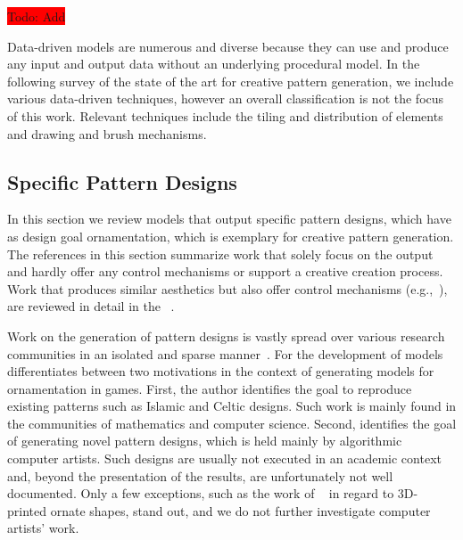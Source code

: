 \colorbox{red} {Todo: Add \cite{pauly_2009_sot, barnes_2017_aso}}



Data-driven models are numerous and diverse because they can use and produce any input and output data without an underlying procedural model. In the following survey of the state of the art for creative pattern generation, we include various data-driven techniques, however an overall classification is not the focus of this work. Relevant techniques include the tiling and distribution of elements and drawing and brush mechanisms.



\subsection{Specific Pattern Designs}
\label{subsec:specific_pattern_designs}

In this section we review models that output specific pattern designs, which have as design goal ornamentation, which is exemplary for creative pattern generation. The references in this section summarize work that solely focus on the output and hardly offer any control mechanisms or support a creative creation process. Work that produces similar aesthetics but also offer control mechanisms (e.g.,~\cite{wong_1998_cgf,yu_2012_ans,zehnder_2016_dso}), are reviewed in detail in the ~.


Work on the generation of pattern designs is vastly spread over various research communities in an isolated and sparse manner~\cite{whitehead_2010_tpd}. For the development of models \citeauthor*{whitehead_2010_tpd}~\cite{whitehead_2010_tpd} differentiates between two motivations in the context of generating models for ornamentation in games. First, the author identifies the goal to reproduce existing patterns such as Islamic and Celtic designs. Such work is mainly found in the communities of mathematics and computer science. Second, \citeauthor*{whitehead_2010_tpd} identifies the goal of generating novel pattern designs, which is held mainly by algorithmic computer artists. Such designs are usually not executed in an academic context and, beyond the presentation of the results, are unfortunately not well documented. Only a few exceptions, such as the work of \citeauthor*{takayama_2016_med}~\cite{takayama_2016_med} in regard to 3D-printed ornate shapes, stand out, and we do not further investigate computer artists' work.


